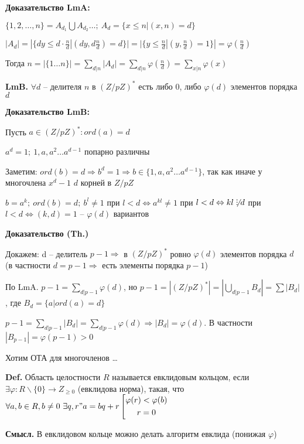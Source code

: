 \documentclass[14pt, letter paper]{article}
\DeclareRobustCommand{\divby}{%
  \mathrel{\text{\vbox{\baselineskip.65ex\lineskiplimit0pt\hbox{.}\hbox{.}\hbox{.}}}}%
}
\begin{document}
\textbf{Доказательство LmA:}

$\{ 1, 2, \ldots, n\} = A_{d_1} \bigcup A_{d_2} \ldots;\ A_d = \{ x \leq n | (x, n) = d \}$

$|A_d| = |\{ dy \leq d \cdot \frac{n}{d} | (dy, d\frac{n}{d}) = d \}| = |\{y \leq \frac{n}{d} | (y, \frac{n}{d}) = 1\}| = \varphi(\frac{n}{d})$

Тогда $n = |\{1 \ldots n\}| = \sum\limits_{d | n} |A_d| = \sum\limits_{d | n} \varphi(\frac{n}{d}) = \sum\limits_{x | n} \varphi(x)$

\vspace{2mm}

\textbf{LmB.} $\forall d$ -- делителя $n$ в $(Z/pZ)^*$ есть либо 0, либо $\varphi(d)$ элементов порядка $d$

\textbf{Доказательство LmB:}

Пусть $a \in (Z/pZ)^* : ord(a) = d$

$a^d = 1;\ 1, a, a^2 \ldots a^{d-1}$ попарно различны

Заметим: $ord(b) = d \Rightarrow b^d = 1 \Rightarrow b \in \{1, a, a^2 \ldots a^{d-1}\}$, так как иначе у многочлена $x^d - 1$ $d$ корней в $Z/pZ$

$b = a^k;\ ord(b) = d;\ b^l \neq 1$ при $l < d \Leftrightarrow a^{kl} \neq 1$ при $l < d \Leftrightarrow kl \not \divby d$ при $l < d \Leftrightarrow (k, d) = 1$ -- $\varphi(d)$ вариантов

\vspace{2mm}

\begin{center}
    \textbf{Доказательство (Th.)}
\end{center}

Докажем: d -- делитель $p-1 \Rightarrow$ в $(Z/pZ)^*$ ровно $\varphi(d)$ элементов порядка $d$ (в частности $d = p - 1 \Rightarrow$ есть элементы порядка $p - 1$)

По LmA. $p-1 = \sum\limits_{d | p-1} \varphi(d)$, но $p - 1 = |(Z/pZ)^*| = |\bigcup\limits_{d | p-1} B_d| = \sum |B_d|$, где $B_d = \{a | ord(a) = d\}$

$p - 1 = \sum\limits_{d | p - 1} |B_d| = \sum\limits_{d | p - 1} \varphi(d) \Rightarrow |B_d| = \varphi(d)$. В частности $|B_{p-1}| = \varphi(p-1) > 0$

\vspace{5mm}

Хотим ОТА для многочленов \ldots

\textbf{Def.} Область целостности $R$ называется евклидовым кольцом, если $\exists \varphi : R\backslash\{0\} \rightarrow Z_{\geq 0}$ (евклидова норма), такая, что $\forall a, b \in R, b \neq 0\ \exists q, r " a = bq + r \left[ \begin{gathered}
    \varphi(r) < \varphi(b) \\
    r = 0
\end{gathered} \right.$

\textbf{Смысл.} В евклидовом кольце можно делать алгоритм евклида (понижая $\varphi$)
\end{document}
